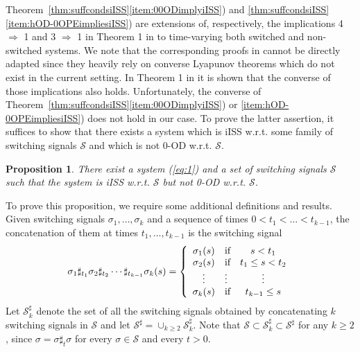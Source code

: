 \documentclass[9pt,final,journal]{IEEEtran}
\newtheorem{prop}{Proposition}
\def\S{\mathcal{S}}
\begin{document}
Theorem~\ref{thm:suffcondsiISS}\ref{item:00ODimplyiISS}) and \ref{thm:suffcondsiISS}\ref{item:hOD-0OPEimpliesiISS}) are extensions of, respectively, the implications 4 $\Rightarrow$ 1 and 3 $\Rightarrow$ 1 in Theorem 1 in \cite{angson_tac00} to time-varying both switched and non-switched systems. We note that the corresponding proofs in \cite{angson_tac00} cannot be directly adapted since they heavily rely on converse Lyapunov theorems which do not exist in the current setting. In Theorem 1 in \cite{angson_tac00} it is shown that the converse of those implications also holds. Unfortunately, the converse of Theorem~\ref{thm:suffcondsiISS}\ref{item:00ODimplyiISS}) or \ref{item:hOD-0OPEimpliesiISS}) does not hold in our case. To prove the latter assertion, it suffices to show that there exists a system which is iISS w.r.t. some family of switching signals $\S$ and which is not 0-OD w.r.t. $\S$. 
\begin{prop} 
  \label{prop:onlysuff}
  There exist a system (\ref{eq:1}) and a set of switching signals $\S$ such that the system is iISS w.r.t. $\S$ but not 0-OD w.r.t. $\S$.
\end{prop}
To prove this proposition, we require some additional definitions and results.  
Given switching signals $\sigma_1,\ldots,\sigma_k$ and a sequence of times $0< t_1<\ldots<t_{k-1}$, the concatenation of them at times $t_1,\ldots,t_{k-1}$ is the switching signal 
  $$ \sigma_1\sharp_{t_1}\sigma_2\sharp_{t_2}\cdots \sharp_{t_{k-1}}\sigma_k(s)=\left \lbrace\begin{array}{clc} \sigma_1(s) & \makebox{if}& s<t_1 \\
                                  \sigma_2(s)& \makebox{if} & t_1\le s < t_2 \\
                                  \vdots & \vdots & \vdots \\
                                  \sigma_k(s) &  \makebox{if} & t_{k-1}\le s
                                 \end{array} \right . $$
Let $\S^\sharp_k$ denote the set of all the switching signals obtained by concatenating $k$ switching signals in $\S$ and let $\S^{\sharp}=
\cup_{k\ge 2} \S^{\sharp}_k$. Note that 
$\S\subset \S^{\sharp}_k \subset \S^{\sharp}$ for any $k\ge 2$, since $\sigma=\sigma \sharp_t \sigma$ for every $\sigma\in \S$ and every $t> 0$.
\end{document}

